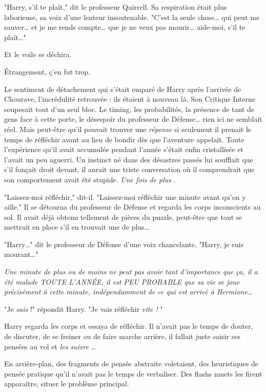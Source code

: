 "Harry, s'il te plaît," dit le professeur Quirrell. Sa respiration était plus laborieuse, sa voix d'une lenteur insoutenable. "C'est la seule chose… qui peut me sauver… et je me rends compte… que je ne veux pas mourir… aide-moi, s'il te plaît…"

Et le voile se déchira.

Étrangement, ç'en fut trop.

Le sentiment de détachement qui s'était emparé de Harry après l'arrivée de Chourave, l'incrédulité retrouvée : ils étaient à nouveau là. Son Critique Interne soupesait tout d'un seul bloc. Le timing, les probabilités, la présence de tant de gens face à cette porte, le désespoir du professeur de Défense… rien ici ne semblait réel. Mais peut-être qu'il pouvait trouver une \emph{réponse}  si seulement il prenait le temps de réfléchir avant au lieu de bondir dès que l'aventure appelait. Toute l'expérience qu'il avait accumulée pendant l'année s'était enfin cristallisée et l'avait un peu aguerri. Un instinct né dans des désastres passés lui soufflait que s'il fonçait droit devant, il aurait une triste conversation où il comprendrait que son comportement avait été stupide. \emph{Une fois de plus} .

"Laissez-moi réfléchir," dit-il. "Laissez-moi réfléchir une minute avant qu'on y aille." Il se détourna du professeur de Défense et regarda les corps inconscients au sol. Il avait déjà obtenu tellement de pièces du puzzle, peut-être que tout se mettrait en place s'il en trouvait une de plus…

"Harry…" dit le professeur de Défense d'une voix chancelante, "Harry, je suis mourant…"

\emph{Une minute de plus ou de moins ne peut pas avoir tant d'importance que ça, il a été malade TOUTE L'ANNÉE, il est PEU PROBABLE que sa vie se joue précisément à cette minute, indépendamment de ce qui est arrivé à Hermione…} 

"Je \emph{sais}  !" répondit Harry. "Je vais réfléchir \emph{vite !} "

Harry regarda les corps et essaya de réfléchir. Il n'avait pas le temps de douter, de discuter, de se freiner ou de faire marche arrière, il fallait juste saisir ses pensées au vol et \emph{les suivre} …

En arrière-plan, des fragments de pensée abstraite voletaient, des heuristiques de pensée pratique qu'il n'avait pas le temps de verbaliser. Des flashs muets les firent apparaître, situer le problème principal.

